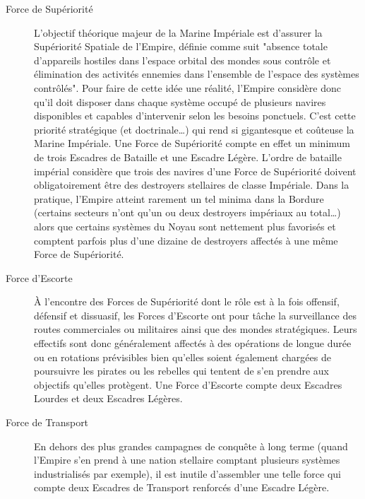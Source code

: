 \documentclass[twoside]{article}
\begin{document}
\begin{description}
	\item[Force de Supériorité] L'objectif théorique majeur de la Marine Impériale est d'assurer la Supériorité Spatiale de l'Empire, définie comme suit "absence totale d'appareils hostiles dans l'espace orbital des mondes sous contrôle et élimination des activités ennemies dans l'ensemble de l'espace des systèmes contrôlés". Pour faire de cette idée une réalité, l'Empire considère donc qu'il doit disposer dans chaque système occupé de plusieurs navires disponibles et capables d'intervenir selon les besoins ponctuels. C'est cette priorité stratégique (et doctrinale\ldots) qui rend si gigantesque et coûteuse la Marine Impériale. Une Force de Supériorité compte en effet un minimum de trois Escadres de Bataille et une Escadre Légère. L'ordre de bataille impérial considère que trois des navires d'une Force de Supériorité doivent obligatoirement être des destroyers stellaires de classe Impériale. Dans la pratique, l'Empire atteint rarement un tel minima dans la Bordure (certains secteurs n'ont qu'un ou deux destroyers impériaux au total\ldots) alors que certains systèmes du Noyau sont nettement plus favorisés et comptent parfois plus d'une dizaine de destroyers affectés à une même Force de Supériorité.
	\item[Force d'Escorte] À l'encontre des Forces de Supériorité dont le rôle est à la fois offensif, défensif et dissuasif, les Forces d'Escorte ont pour tâche la surveillance des routes commerciales ou militaires ainsi que des mondes stratégiques. Leurs effectifs sont donc généralement affectés à des opérations de longue durée ou en rotations prévisibles bien qu'elles soient également chargées de poursuivre les pirates ou les rebelles qui tentent de s'en prendre aux objectifs qu'elles protègent. Une Force d'Escorte compte deux Escadres Lourdes et deux Escadres Légères.
	\item[Force de Transport] En dehors des plus grandes campagnes de conquête à long terme (quand l'Empire s'en prend à une nation stellaire comptant plusieurs systèmes industrialisés par exemple), il est inutile d'assembler une telle force qui compte deux Escadres de Transport renforcés d'une Escadre Légère.

\end{description}
\end{document}
